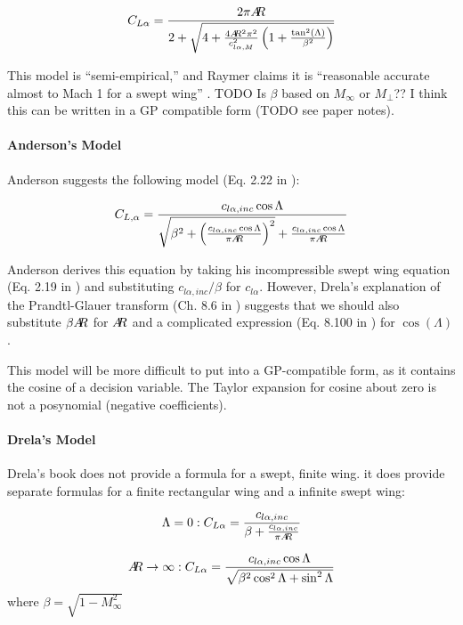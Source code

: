 \documentclass[12pt]{article}
\newcommand{\ar}{A\mkern-6mu R}
\begin{document}
\begin{equation}
C_{L\alpha} = \frac{2 \pi \ar}{2 + \sqrt{4 + \frac{4 \ar^2 \pi^2}{c_{l\alpha, M}^2} \left( 1 + \frac{\tan^2(\Lambda)}{\beta^2} \right)}}
\end{equation}

This model is ``semi-empirical,'' and Raymer claims it is ``reasonable accurate almost to Mach 1 for a swept wing'' \cite{Raymer2012}. 
TODO Is $\beta$ based on $M_\infty$ or $M_\perp$??
I think this can be written in a GP compatible form (TODO see paper notes).

\paragraph{Anderson's Model}
Anderson suggests the following model (Eq. 2.22 in \cite{Anderson1999}):

\begin{equation}
C_{L,\alpha} = \frac{c_{l\alpha, inc} \cos\Lambda}{
\sqrt{\beta^2 + \left( \frac{c_{l\alpha, inc} \cos\Lambda}{\pi \ar} \right)^2}
+ \frac{c_{l\alpha, inc} \cos\Lambda}{\pi \ar}}
\end{equation}

Anderson derives this equation by taking his incompressible swept wing equation (Eq. 2.19 in \cite{Anderson1999}) and substituting $c_{l\alpha, inc}/\beta$ for $c_{l\alpha}$. However, Drela's explanation of the Prandtl-Glauer transform (Ch. 8.6 in \cite{Drela2014}) suggests that we should also substitute $\beta \ar$ for $\ar$ and a complicated expression (Eq. 8.100 in \cite{Drela2014}) for $\cos(\Lambda)$.

This model will be more difficult to put into a GP-compatible form, as it contains the cosine of a decision variable. The Taylor expansion for cosine about zero is not a posynomial (negative coefficients).

\paragraph{Drela's Model}
Drela's book \cite{Drela2014} does not provide a formula for a swept, finite wing. it does provide separate formulas for a finite rectangular wing and a infinite swept wing:

\begin{equation}
\Lambda = 0: C_{L\alpha} = \frac{c_{l\alpha, inc}}{\beta + \frac{c_{l\alpha, inc}}{\pi \ar}}
\end{equation}

\begin{equation}
\ar \rightarrow \infty : C_{L\alpha} = \frac{c_{l\alpha, inc} \cos\Lambda}{
    \sqrt{\beta^2 \cos^2\Lambda + \sin^2\Lambda}}
\end{equation}
where $\beta = \sqrt{1 - M_\infty^2}$
\end{document}
